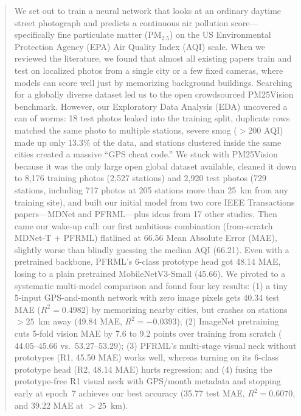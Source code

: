 \documentclass[conference]{IEEEtran}
\newcommand{\pmtwofive}{PM$_{2.5}$}
\begin{document}
\begin{abstract}
  We set out to train a neural network that looks at an ordinary daytime street
  photograph and predicts a continuous air pollution score---specifically fine
  particulate matter (\pmtwofive) on the US Environmental Protection Agency
  (EPA) Air Quality Index (AQI) scale. When we reviewed the literature, we found
  that almost all existing papers train and test on localized photos from a
  single city or a few fixed cameras, where models can score well just by
  memorizing background buildings. Searching for a globally diverse dataset led
  us to the open crowdsourced PM25Vision benchmark. However, our Exploratory
  Data Analysis (EDA) uncovered a can of worms: 18 test photos leaked into the
  training split, duplicate rows matched the same photo to multiple stations,
  severe smog ($> 200$ AQI) made up only 13.3\% of the data, and stations
  clustered inside the same cities created a massive ``GPS cheat code.'' We
  stuck with PM25Vision because it was the only large open global dataset
  available, cleaned it down to 8,176 training photos (2,527 stations) and 2,920
  test photos (729 stations, including 717 photos at 205 stations more than
  25~km from any training site), and built our initial model from two core IEEE
  Transactions papers---MDNet and PFRML---plus ideas from 17 other studies. Then
  came our wake-up call: our first ambitious combination (from-scratch MDNet-T +
  PFRML) flatlined at 66.56 Mean Absolute Error (MAE), slightly worse than
  blindly guessing the median AQI (66.21). Even with a pretrained backbone,
  PFRML's 6-class prototype head got 48.14 MAE, losing to a plain pretrained
  MobileNetV3-Small (45.66). We pivoted to a systematic multi-model comparison
  and found four key results: (1) a tiny 5-input GPS-and-month network with zero
  image pixels gets 40.34 test MAE ($R^2 = 0.4982$) by memorizing nearby cities,
  but crashes on stations $> 25$~km away (49.84 MAE, $R^2 = -0.0393$); (2)
  ImageNet pretraining cuts 5-fold vision MAE by 7.6 to 9.2 points over training
  from scratch ($44.05\text{--}45.66$ vs.\ $53.27\text{--}53.29$); (3) PFRML's
  multi-stage visual neck without prototypes (R1, 45.50 MAE) works well, whereas
  turning on its 6-class prototype head (R2, 48.14 MAE) hurts regression; and
  (4) fusing the prototype-free R1 visual neck with GPS/month metadata and
  stopping early at epoch~7 achieves our best accuracy (35.77 test MAE,
  $R^2 = 0.6070$, and 39.22 MAE at $> 25$~km).
\end{abstract}
\end{document}

